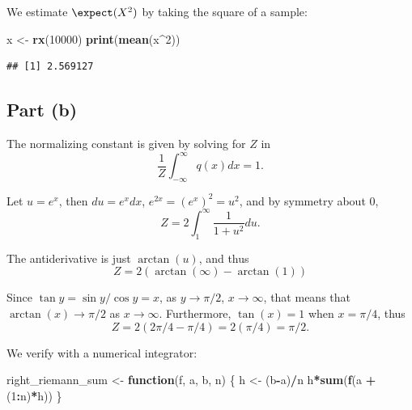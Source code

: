 \documentclass[
  11pt,
]{article}
\newenvironment{Shaded}{\begin{snugshade}}{\end{snugshade}}
\newcommand{\ControlFlowTok}[1]{\textcolor[rgb]{0.13,0.29,0.53}{\textbf{#1}}}
\newcommand{\DecValTok}[1]{\textcolor[rgb]{0.00,0.00,0.81}{#1}}
\newcommand{\FunctionTok}[1]{\textcolor[rgb]{0.13,0.29,0.53}{\textbf{#1}}}
\newcommand{\NormalTok}[1]{#1}
\newcommand{\OtherTok}[1]{\textcolor[rgb]{0.56,0.35,0.01}{#1}}
\newcommand{\SpecialCharTok}[1]{\textcolor[rgb]{0.81,0.36,0.00}{\textbf{#1}}}
\begin{document}
We estimate \(\expect(X^2)\) by taking the square of a sample:

\begin{Shaded}
\begin{Highlighting}[]
\NormalTok{x }\OtherTok{\textless{}{-}} \FunctionTok{rx}\NormalTok{(}\DecValTok{10000}\NormalTok{)}
\FunctionTok{print}\NormalTok{(}\FunctionTok{mean}\NormalTok{(x}\SpecialCharTok{\^{}}\DecValTok{2}\NormalTok{))}
\end{Highlighting}
\end{Shaded}

\begin{verbatim}
## [1] 2.569127
\end{verbatim}

\hypertarget{part-b}{%
\subsection{Part (b)}\label{part-b}}


The normalizing constant is given by solving for \(Z\) in \[
  \frac{1}{Z} \int_{-\infty}^{\infty} q(x) dx = 1.
\]

Let \(u = e^x\), then \(du = e^x dx\), \(e^{2x} = (e^{x})^2 = u^2\), and
by symmetry about \(0\), \[
  Z = 2 \int_{1}^{\infty} \frac{1}{1+u^2} du.
\]

The antiderivative is just \(\operatorname{arctan}(u)\), and thus \[
  Z = 2 (\operatorname{arctan}(\infty) - \operatorname{arctan}(1))
\]

Since \(\tan y = \sin y / \cos y = x\), as \(y \to \pi/2\),
\(x \to \infty\), that means that \(\operatorname{arctan}(x) \to \pi/2\)
as \(x \to \infty\). Furthermore, \(\tan(x)=1\) when \(x=\pi/4\), thus
\[
  Z = 2 (2\pi/4 - \pi/4) = 2(\pi/4) = \pi/2.
\]

We verify with a numerical integrator:

\begin{Shaded}
\begin{Highlighting}[]
\NormalTok{right\_riemann\_sum }\OtherTok{\textless{}{-}} \ControlFlowTok{function}\NormalTok{(f, a, b, n)}
\NormalTok{\{}
\NormalTok{  h }\OtherTok{\textless{}{-}}\NormalTok{ (b}\SpecialCharTok{{-}}\NormalTok{a)}\SpecialCharTok{/}\NormalTok{n}
\NormalTok{  h}\SpecialCharTok{*}\FunctionTok{sum}\NormalTok{(}\FunctionTok{f}\NormalTok{(a }\SpecialCharTok{+}\NormalTok{ (}\DecValTok{1}\SpecialCharTok{:}\NormalTok{n)}\SpecialCharTok{*}\NormalTok{h))}
\NormalTok{\}}
\end{Highlighting}
\end{Shaded}
\end{document}

